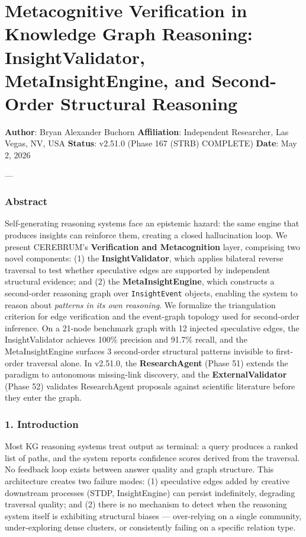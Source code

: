 \section{Metaco\-gnitive Verifi\-cation in Knowledge Graph Reasoning: InsightValidator, MetaInsightEngine, and Second-Order Structural Reasoning}

\textbf{Author}: Bryan Alexander Buchorn  
\textbf{Affiliation}: Independent Researcher, Las Vegas, NV, USA  
\textbf{Status}: v2.51.0 (Phase 167 (STRB) COMPLETE)
\textbf{Date}: May 2, 2026

---

\subsubsection{Abstract}
Self-generating reasoning systems face an epistemic hazard: the same engine that produces insights can reinforce them, creating a closed hallu\-cination loop. We present CEREBRUM's \textbf{Verifi\-cation and Metaco\-gnition} layer, comprising two novel components: (1) the \textbf{InsightValidator}, which applies bilateral reverse traversal to test whether speculative edges are supported by independent structural evidence; and (2) the \textbf{MetaInsightEngine}, which constructs a second-order reasoning graph over \texttt{InsightEvent} objects, enabling the system to reason about \textit{patterns in its own reasoning}. We formalize the trian\-gulation criterion for edge verif\-ication and the event-graph topology used for second-order inference. On a 21-node benchmark graph with 12 injected speculative edges, the InsightValidator achieves 100\% precision and 91.7\% recall, and the MetaInsightEngine surfaces 3 second-order structural patterns invisible to first-order traversal alone. In v2.51.0, the \textbf{ResearchAgent} (Phase 51) extends the paradigm to autonomous missing-link discovery, and the \textbf{ExternalValidator} (Phase 52) validates ResearchAgent proposals against scientific literature before they enter the graph.

\subsubsection{1. Introd\-uction}
Most KG reasoning systems treat output as terminal: a query produces a ranked list of paths, and the system reports confidence scores derived from the traversal. No feedback loop exists between answer quality and graph structure. This archi\-tecture creates two failure modes: (1) speculative edges added by creative downstream processes (STDP, InsightEngine) can persist indef\-initely, degrading traversal quality; and (2) there is no mechanism to detect when the reasoning system itself is exhibiting structural biases — over-relying on a single community, under-exploring dense clusters, or consi\-stently failing on a specific relation type.

